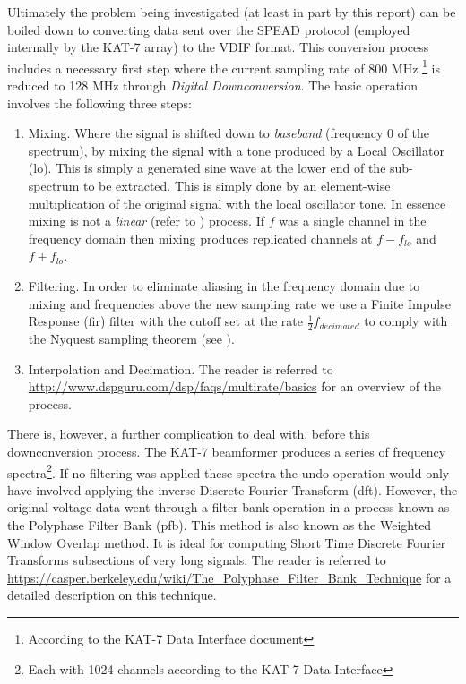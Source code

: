 \documentclass[a4paper,10pt]{article}
\begin{document}
Ultimately the problem being investigated (at least in part by this report) can be boiled down to converting data sent over the SPEAD protocol (employed 
internally by the KAT-7 array) to the VDIF format. This conversion process includes a necessary first step where the current sampling rate of 800 MHz
\footnote{According to the KAT-7 Data Interface document} is reduced to 128 MHz through \textit{Digital Downconversion}. The basic operation involves the following three
steps:
\begin{enumerate}
 \item Mixing. Where the signal is shifted down to \textit{baseband} (frequency 0 of the spectrum), by mixing the signal with a tone produced by a Local Oscillator (\gls{lo}).
 This is simply a generated sine wave at the lower end of the sub-spectrum to be extracted. This is simply done by an element-wise multiplication of the original signal with
 the local oscillator tone. In essence mixing is not a \textit{linear} (refer to \cite[ch. 5]{smith1997scientist}) process. If $f$ was a single channel in the 
 frequency domain then mixing produces replicated channels at $f - f_{lo}$ and $f + f_{lo}$.
 \item Filtering. In order to eliminate aliasing in the frequency domain due to mixing and frequencies above the new sampling rate we use a Finite Impulse Response 
 (\gls{fir}) filter with the cutoff set at the rate $\frac{1}{2}f_{decimated}$ to comply with the Nyquest sampling theorem (see \cite[ch. 3]{smith1997scientist}).
 \item Interpolation and Decimation. The reader is referred to \url{http://www.dspguru.com/dsp/faqs/multirate/basics} for an overview of the process.  
\end{enumerate}

There is, however, a further complication to deal with, before this downconversion process. The KAT-7 beamformer produces a series of frequency spectra\footnote{Each 
with 1024 channels according to the KAT-7 Data Interface}. If no filtering was applied these spectra the undo operation would only have involved applying the inverse
Discrete Fourier Transform (\gls{dft}). However, the original voltage data went through a filter-bank operation in a process known as the Polyphase Filter Bank (\gls{pfb}). This
method is also known as the Weighted Window Overlap method. It is ideal for computing Short Time Discrete Fourier Transforms subsections of very long signals. The reader is 
referred to \url{https://casper.berkeley.edu/wiki/The_Polyphase_Filter_Bank_Technique} for a detailed description on this technique.
\end{document}
